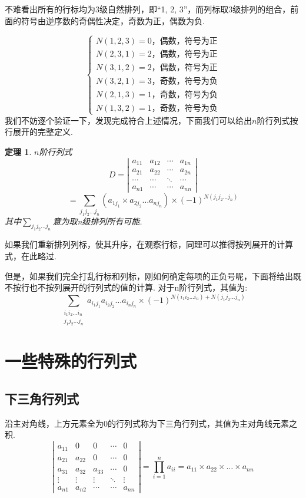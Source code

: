 \documentclass[12pt, a4paper, oneside]{ctexbook}
\newtheorem{theorem}{定理}[section]
\begin{document}
不难看出所有的行标均为3级自然排列，即``1, 2, 3''，而列标取3级排列的组合，前面的符号由逆序数的奇偶性决定，奇数为正，偶数为负.

$$\begin{cases}
    N(1, 2, 3) = 0\mbox{，偶数，符号为正} \\
    N(2, 3, 1) = 2\mbox{，偶数，符号为正} \\
    N(3, 1, 2) = 2\mbox{，偶数，符号为正} \\
    N(3, 2, 1) = 3\mbox{，奇数，符号为负} \\
    N(2, 1, 3) = 1\mbox{，奇数，符号为负} \\
    N(1, 3, 2) = 1\mbox{，奇数，符号为负}
\end{cases}$$
我们不妨逐个验证一下，发现完成符合上述情况，下面我们可以给出$n$阶行列式按行展开的完整定义.

\begin{theorem}
    $n$阶行列式
    $$D=\left | \begin{matrix}
        a_{11} & a_{12} & \cdots & a_{1n} \\
        a_{21} & a_{22} & \cdots & a_{2n} \\
        \cdots & \cdots & \ddots & \cdots \\
        a_{n1} & \cdots & \cdots & a_{nn}
    \end{matrix} \right |$$
    $$=\sum_{j_1 j_2 \dots j_n}(a_{1j_{1}} \times a_{2j_{2}} \dots a_{nj_{n}}) \times (-1)^{N(j_1 j_2 \dots j_n)}$$
    其中$\sum_{j_1 j_2 \dots j_n}$意为取n级排列所有可能. 
\end{theorem}

如果我们重新排列列标，使其升序，在观察行标，同理可以推得按列展开的计算式，在此略过. 


但是，如果我们完全打乱行标和列标，刚如何确定每项的正负号呢，下面将给出既不按行也不按列展开的行列式的值的计算. 
对于n阶行列式，其值为: 
$$\sum_{\substack{i_1i_2 \dots i_n \\ j_1j_2 \dots j_n}}a_{i_1j_1}a_{i_2j_2} \dots a_{i_nj_n} \times (-1)^{N(i_1i_2 \dots i_n) + N(j_1j_2 \dots j_n)}$$

\section{一些特殊的行列式}

\subsection{下三角行列式}
沿主对角线，上方元素全为0的行列式称为下三角行列式，其值为主对角线元素之积. 
$$\left | \begin{matrix}
    a_{11} & 0      & 0      & \cdots & 0 \\
    a_{21} & a_{22} & 0      & \cdots & 0 \\
    a_{31} & a_{32} & a_{33} & \cdots & 0 \\
    \vdots & \vdots & \vdots & \ddots & \vdots \\
    a_{n1} & a_{n2} & \cdots & \cdots & a_{nn}
\end{matrix} \right | = \prod_{i=1}^{n}a_{ii} = a_{11} \times a_{22} \times \dots \times a_{nn}$$
\end{document}
